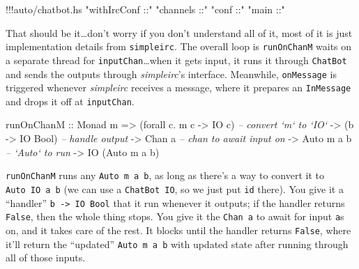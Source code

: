 \documentclass[]{article}
\newenvironment{Shaded}{}{}
\newcommand{\DataTypeTok}[1]{\textcolor[rgb]{0.56,0.13,0.00}{{#1}}}
\newcommand{\StringTok}[1]{\textcolor[rgb]{0.25,0.44,0.63}{{#1}}}
\newcommand{\CommentTok}[1]{\textcolor[rgb]{0.38,0.63,0.69}{\textit{{#1}}}}
\newcommand{\OtherTok}[1]{\textcolor[rgb]{0.00,0.44,0.13}{{#1}}}
\newcommand{\FunctionTok}[1]{\textcolor[rgb]{0.02,0.16,0.49}{{#1}}}
\newcommand{\NormalTok}[1]{{#1}}
\begin{document}
\begin{Shaded}
\begin{Highlighting}[]
\FunctionTok{!!!}\NormalTok{auto}\FunctionTok{/}\NormalTok{chatbot}\FunctionTok{.}\NormalTok{hs }\StringTok{"withIrcConf ::"} \StringTok{"channels ::"} \StringTok{"conf ::"} \StringTok{"main ::"}
\end{Highlighting}
\end{Shaded}

That should be it\ldots{}don't worry if you don't understand all of it,
most of it is just implementation details from \texttt{simpleirc}. The
overall loop is \texttt{runOnChanM} waits on a separate thread for
\texttt{inputChan}\ldots{}when it gets input, it runs it through
\texttt{ChatBot} and sends the outputs through \emph{simpleirc}'s
interface. Meanwhile, \texttt{onMessage} is triggered whenever
\emph{simpleirc} receives a message, where it prepares an
\texttt{InMessage} and drops it off at \texttt{inputChan}.

\begin{Shaded}
\begin{Highlighting}[]
\OtherTok{runOnChanM ::} \DataTypeTok{Monad} \NormalTok{m}
           \OtherTok{=>} \NormalTok{(forall c}\FunctionTok{.} \NormalTok{m c }\OtherTok{->} \DataTypeTok{IO} \NormalTok{c)   }\CommentTok{-- convert `m` to `IO`}
           \OtherTok{->} \NormalTok{(b }\OtherTok{->} \DataTypeTok{IO} \DataTypeTok{Bool}\NormalTok{)            }\CommentTok{-- handle output}
           \OtherTok{->} \DataTypeTok{Chan} \NormalTok{a                    }\CommentTok{-- chan to await input on}
           \OtherTok{->} \DataTypeTok{Auto} \NormalTok{m a b                }\CommentTok{-- `Auto` to run}
           \OtherTok{->} \DataTypeTok{IO} \NormalTok{(}\DataTypeTok{Auto} \NormalTok{m a b)}
\end{Highlighting}
\end{Shaded}

\texttt{runOnChanM} runs any \texttt{Auto\ m\ a\ b}, as long as there's
a way to convert it to \texttt{Auto\ IO\ a\ b} (we can use a
\texttt{ChatBot\ IO}, so we just put \texttt{id} there). You give it a
``handler'' \texttt{b\ -\textgreater{}\ IO\ Bool} that it run whenever
it outputs; if the handler returns \texttt{False}, then the whole thing
stops. You give it the \texttt{Chan\ a} to await for input \texttt{a}s
on, and it takes care of the rest. It blocks until the handler returns
\texttt{False}, where it'll return the ``updated''
\texttt{Auto\ m\ a\ b} with updated state after running through all of
those inputs.
\end{document}
